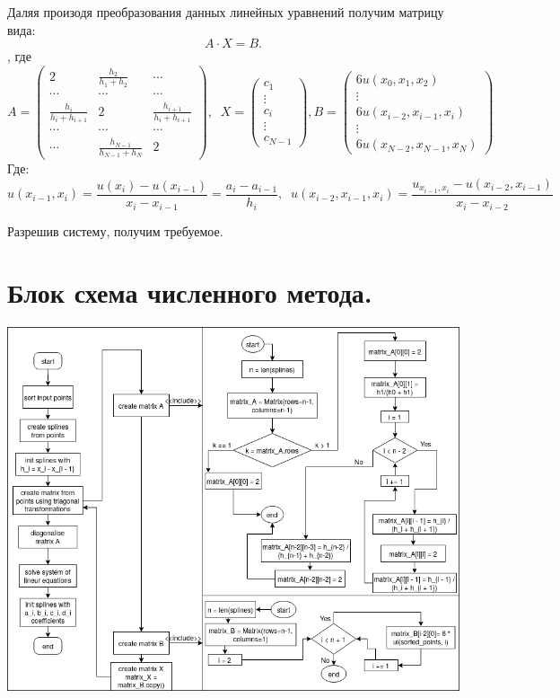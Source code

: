 \documentclass[11pt, a4paper]{article}
\begin{document}
\noindent
Даляя произодя преобразования данных линейных уравнений получим матрицу вида: \[
A \cdot X = B
.\], где \[
A = 
\begin{pmatrix}
  2 & \frac{h_2}{h_1 + h_2} & \cdots \\
  \cdots & \cdots & \cdots\\
  \frac{h_i}{h_i + h_{i + 1}} & 2 & \frac{h_{i + 1}}{h_{i} + h_{i + 1}} \\
  \cdots & \cdots & \cdots \\
  \cdots & \frac{h_{N - 1}}{h_{N - 1} + h_{N}} & 2
\end{pmatrix}, \;\;
X = 
\begin{pmatrix}
c_1 \\
\vdots \\
c_i \\
\vdots \\
c_{N - 1}
\end{pmatrix},
B = 
\begin{pmatrix}
6 u(x_0, x_1, x_2) \\
\vdots \\
6 u(x_{i - 2}, x_{i - 1}, x_{i}) \\
\vdots \\
6 u(x_{N - 2}, x_{N - 1}, x_{N})
\end{pmatrix}
\]
Где: \[
   u(x_{i - 1}, x_{i}) = \frac{u(x_i) - u(x_{i - 1})}{x_i - x_{i - 1}} = \frac{a_i - a_{i -
   1}}{h_i}, \;\;
  u(x_{i - 2}, x_{i - 1}, x_i) = \frac{u_{x_{i - 1}, x_i} - u(x_{i - 2}, x_{i - 1})}{x_i - x_{i - 2}}
\] 

\noindent
Разрешив систему, получим требуемое.

\section{Блок схема численного метода.}

  \includegraphics[width=\linewidth]{draw.png}
\end{document}
